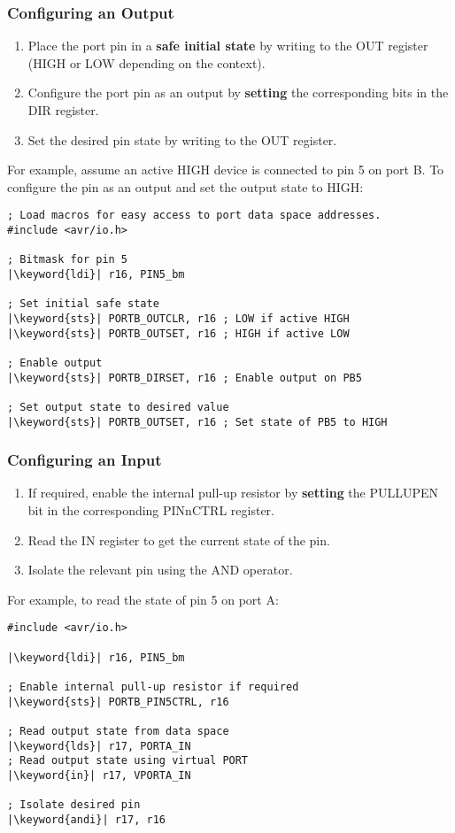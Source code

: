 \documentclass{article}
\newcommand{\keyword}[1]{\textcolor[rgb]{0.00,0.50,0.00}{\textbf{#1}}}
\begin{document}
\subsubsection{Configuring an Output}
\begin{enumerate}
    \item Place the port pin in a \textbf{safe initial state} by
          writing to the OUT register (HIGH or LOW depending on the
          context).
    \item Configure the port pin as an output by \textbf{setting} the
          corresponding bits in the DIR register.
    \item Set the desired pin state by writing to the OUT register.
\end{enumerate}
For example, assume an active HIGH device is connected to pin 5 on port
B. To configure the pin as an output and set the output state to HIGH:
\begin{verbatim}
; Load macros for easy access to port data space addresses.
#include <avr/io.h>

; Bitmask for pin 5
|\keyword{ldi}| r16, PIN5_bm

; Set initial safe state
|\keyword{sts}| PORTB_OUTCLR, r16 ; LOW if active HIGH
|\keyword{sts}| PORTB_OUTSET, r16 ; HIGH if active LOW

; Enable output
|\keyword{sts}| PORTB_DIRSET, r16 ; Enable output on PB5

; Set output state to desired value
|\keyword{sts}| PORTB_OUTSET, r16 ; Set state of PB5 to HIGH
\end{verbatim}
\subsubsection{Configuring an Input}
\begin{enumerate}
    \item If required, enable the internal pull-up resistor by
          \textbf{setting} the PULLUPEN bit in the \linebreak
          corresponding PINnCTRL register.
    \item Read the IN register to get the current state of the pin.
    \item Isolate the relevant pin using the AND operator.
\end{enumerate}
For example, to read the state of pin 5 on port A:
\begin{verbatim}
#include <avr/io.h>

|\keyword{ldi}| r16, PIN5_bm

; Enable internal pull-up resistor if required
|\keyword{sts}| PORTB_PIN5CTRL, r16

; Read output state from data space
|\keyword{lds}| r17, PORTA_IN
; Read output state using virtual PORT
|\keyword{in}| r17, VPORTA_IN

; Isolate desired pin
|\keyword{andi}| r17, r16
\end{verbatim}
\end{document}
